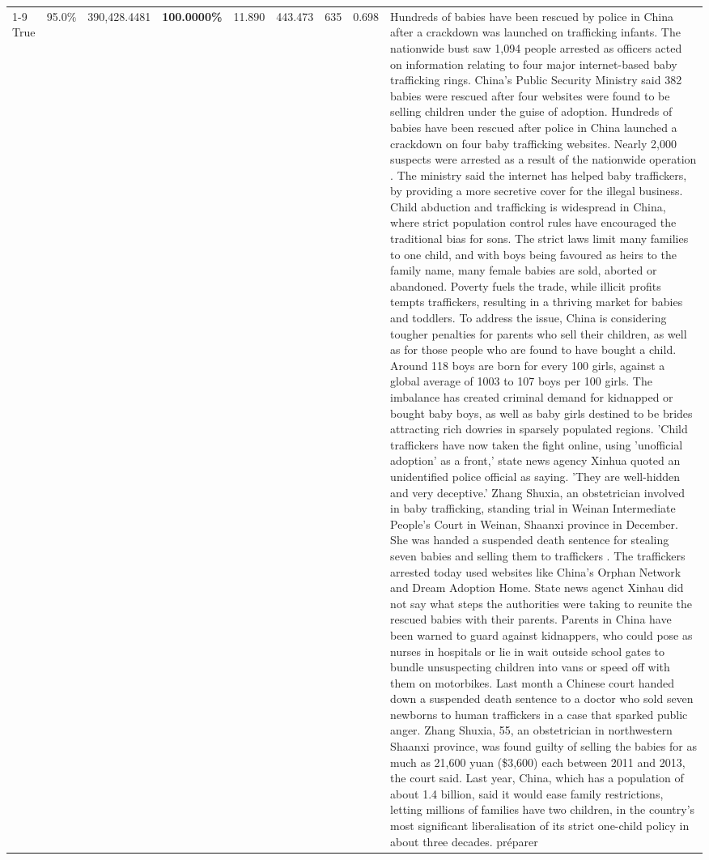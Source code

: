 \begin{table}[H]
\begin{tabular}{lllrlllll}
\cline{1-9}
True & 95.0\% & 390,428.4481 & \bfseries \color{red} 100.0000\% & 11.890 & 443.473 & 635 & 0.698 & Hundreds of babies have been rescued by police in China after a crackdown was launched on trafficking infants. The nationwide bust saw 1,094 people arrested as officers acted on information relating to four major internet-based baby trafficking rings. China's Public Security Ministry said 382 babies were rescued after four websites were found to be selling children under the guise of adoption. Hundreds of babies have been rescued after police in China launched a crackdown on four baby trafficking websites. Nearly 2,000 suspects were arrested as a result of the nationwide operation . The ministry said the internet has helped baby traffickers, by providing a more secretive cover for the illegal business. Child abduction and trafficking is widespread in China, where strict population control rules have encouraged the traditional bias for sons. The strict laws limit many families to one child, and with boys being favoured as heirs to the family name, many female babies are sold, aborted or abandoned. Poverty fuels the trade, while illicit profits tempts traffickers, resulting in a thriving market for babies and toddlers. To address the issue, China is considering tougher penalties for parents who sell their children, as well as for those people who are found to have bought a child. Around 118 boys are born for every 100 girls, against a global average of 1003 to 107 boys per 100 girls. The imbalance has created criminal demand for kidnapped or bought baby boys, as well as baby girls destined to be brides attracting rich dowries in sparsely populated regions. 'Child traffickers have now taken the fight online, using 'unofficial adoption' as a front,' state news agency Xinhua quoted an unidentified police official as saying. 'They are well-hidden and very deceptive.' Zhang Shuxia, an obstetrician involved in baby trafficking, standing trial in Weinan Intermediate People's Court in Weinan, Shaanxi province in December. She was handed a suspended death sentence for stealing seven babies and selling them to traffickers . The traffickers arrested today used websites like China's Orphan Network and Dream Adoption Home. State news agenct Xinhau did not say what steps the authorities were taking to reunite the rescued babies with their parents. Parents in China have been warned to guard against kidnappers, who could pose as nurses in hospitals or lie in wait outside school gates to bundle unsuspecting children into vans or speed off with them on motorbikes. Last month a Chinese court handed down a suspended death sentence to a doctor who sold seven newborns to human traffickers in a case that sparked public anger. Zhang Shuxia, 55, an obstetrician in northwestern Shaanxi province, was found guilty of selling the babies for as much as 21,600 yuan (\$3,600) each between 2011 and 2013, the court said. Last year, China, which has a population of about 1.4 billion, said it would ease family restrictions, letting millions of families have two children, in the country's most significant liberalisation of its strict one-child policy in about three decades. préparer \\

\end{tabular}
\end{table}
